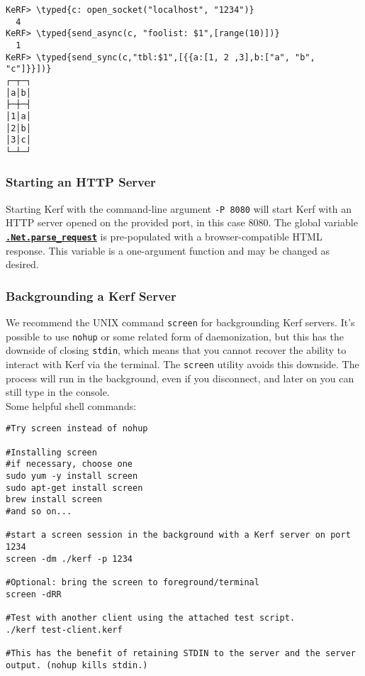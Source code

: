 \documentclass{article}
\newcommand{\typed}[1]{\textcolor{TealBlue}{#1}}
\newcommand{\const}[2]{\hyperref[const:#2]{\textbf{\texttt{#1}}}}
\begin{document}
\begin{Verbatim}
KeRF> \typed{c: open_socket("localhost", "1234")}
  4
KeRF> \typed{send_async(c, "foolist: $1",[range(10)])}
  1
KeRF> \typed{send_sync(c,"tbl:$1",[{{a:[1, 2 ,3],b:["a", "b", "c"]}}])}
┌─┬─┐
│a│b│
├─┼─┤
│1│a│
│2│b│
│3│c│
└─┴─┘

\end{Verbatim}
\pagebreak

\subsubsection{Starting an HTTP Server}

Starting Kerf with the command-line argument \texttt{-P 8080} will start Kerf with an HTTP server opened on the provided port, in this case 8080. The global variable \const{.Net.parse\_request}{netParseRequest} is pre-populated with a browser-compatible HTML response. This variable is a one-argument function and may be changed as desired.

\subsubsection{Backgrounding a Kerf Server}

We recommend the UNIX command  \texttt{screen} for backgrounding Kerf servers. It's possible to use \texttt{nohup} or some related form of daemonization, but this has the downside of closing \texttt{stdin}, which means that you cannot recover the ability to interact with Kerf via the terminal. The \texttt{screen} utility avoids this downside. The process will run in the background, even if you disconnect, and later on you can still type in the console.\\

Some helpful shell commands:
\begin{Verbatim}
#Try screen instead of nohup

#Installing screen
#if necessary, choose one
sudo yum -y install screen
sudo apt-get install screen
brew install screen
#and so on...

#start a screen session in the background with a Kerf server on port 1234
screen -dm ./kerf -p 1234

#Optional: bring the screen to foreground/terminal
screen -dRR

#Test with another client using the attached test script.
./kerf test-client.kerf

#This has the benefit of retaining STDIN to the server and the server output. (nohup kills stdin.)
\end{Verbatim}
\end{document}
